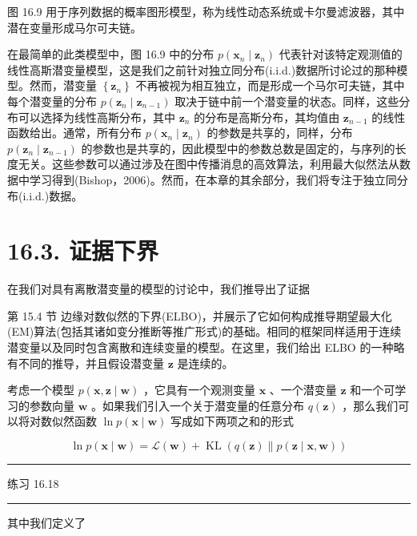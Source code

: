 \documentclass[10pt]{report}
\newcommand{\HRule}{\begin{center}\rule{0.9\linewidth}{0.2mm}\end{center}}
\begin{document}
图 16.9 用于序列数据的概率图形模型，称为线性动态系统或卡尔曼滤波器，其中潜在变量形成马尔可夫链。

在最简单的此类模型中，图 16.9 中的分布 \(p\left( {{\mathbf{x}}_{n} \mid  {\mathbf{z}}_{n}}\right)\) 代表针对该特定观测值的线性高斯潜变量模型，这是我们之前针对独立同分布(i.i.d.)数据所讨论过的那种模型。然而，潜变量 \(\left\{  {\mathbf{z}}_{n}\right\}\) 不再被视为相互独立，而是形成一个马尔可夫链，其中每个潜变量的分布 \(p\left( {{\mathbf{z}}_{n} \mid  {\mathbf{z}}_{n - 1}}\right)\) 取决于链中前一个潜变量的状态。同样，这些分布可以选择为线性高斯分布，其中 \({\mathbf{z}}_{n}\) 的分布是高斯分布，其均值由 \({\mathbf{z}}_{n - 1}\) 的线性函数给出。通常，所有分布 \(p\left( {{\mathbf{x}}_{n} \mid  {\mathbf{z}}_{n}}\right)\) 的参数是共享的，同样，分布 \(p\left( {{\mathbf{z}}_{n} \mid  {\mathbf{z}}_{n - 1}}\right)\) 的参数也是共享的，因此模型中的参数总数是固定的，与序列的长度无关。这些参数可以通过涉及在图中传播消息的高效算法，利用最大似然法从数据中学习得到(Bishop，2006)。然而，在本章的其余部分，我们将专注于独立同分布(i.i.d.)数据。

\section*{16.3. 证据下界}

在我们对具有离散潜变量的模型的讨论中，我们推导出了证据

第 15.4 节 边缘对数似然的下界(ELBO)，并展示了它如何构成推导期望最大化(EM)算法(包括其诸如变分推断等推广形式)的基础。相同的框架同样适用于连续潜变量以及同时包含离散和连续变量的模型。在这里，我们给出 ELBO 的一种略有不同的推导，并且假设潜变量 \(\mathbf{z}\) 是连续的。

考虑一个模型 \(p\left( {\mathbf{x},\mathbf{z} \mid  \mathbf{w}}\right)\) ，它具有一个观测变量 \(\mathbf{x}\) 、一个潜变量 \(\mathbf{z}\) 和一个可学习的参数向量 \(\mathbf{w}\) 。如果我们引入一个关于潜变量的任意分布 \(q\left( \mathbf{z}\right)\) ，那么我们可以将对数似然函数 \(\ln p\left( {\mathbf{x} \mid  \mathbf{w}}\right)\) 写成如下两项之和的形式

\[
\ln p\left( {\mathbf{x} \mid  \mathbf{w}}\right)  = \mathcal{L}\left( \mathbf{w}\right)  + \operatorname{KL}\left( {q\left( \mathbf{z}\right) \parallel p\left( {\mathbf{z} \mid  \mathbf{x},\mathbf{w}}\right) }\right)  \tag{16.57}
\]

\HRule

练习 16.18

\HRule

其中我们定义了
\end{document}
